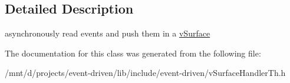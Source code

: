\subsection{Detailed Description}
asynchronously read events and push them in a \hyperlink{classev_1_1vSurface}{v\+Surface} 

The documentation for this class was generated from the following file\+:\begin{DoxyCompactItemize}
\item 
/mnt/d/projects/event-\/driven/lib/include/event-\/driven/v\+Surface\+Handler\+Th.\+h\end{DoxyCompactItemize}
